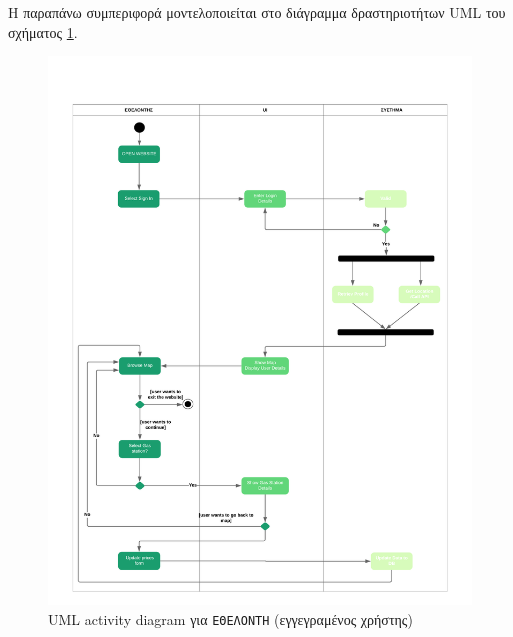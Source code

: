 Η παραπάνω συμπεριφορά μοντελοποιείται στο διάγραμμα δραστηριοτήτων UML του σχήματος  \ref{volunteer}.
\begin{figure}
	\centering\includegraphics[width = \linewidth]{uml/volunteer.png}
	\caption{UML activity diagram για \texttt{ΕΘΕΛΟΝΤΗ} (εγγεγραμένος χρήστης)}
	\label{volunteer}
\end{figure}